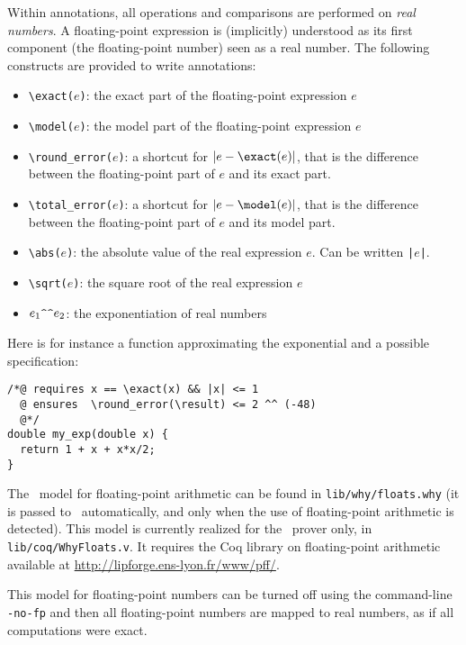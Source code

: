 \documentclass[12pt,a4paper,twoside,openright]{report}
\def\result{\char'134 result}
\begin{document}
Within annotations, all operations and comparisons are performed on
\emph{real numbers}. A floating-point expression is (implicitly)
understood as its first component (the floating-point number) seen as
a real number. The following constructs are provided to write
annotations: 

\begin{itemize}
\item \verb!\exact(!$e$\verb!)!: the exact part of the floating-point
  expression $e$
\item \verb!\model(!$e$\verb!)!: the model part of the floating-point
  expression $e$
\item \verb!\round_error(!$e$\verb!)!: a shortcut for $|e -
  \verb!\exact!(e)|$, that is the difference between the
  floating-point part of $e$ and its exact part.
\item \verb!\total_error(!$e$\verb!)!: a shortcut for $|e -
  \verb!\model!(e)|$, that is the difference between the
  floating-point part of $e$ and its model part.
\item \verb!\abs(!$e$\verb!)!: the absolute value of the real
  expression $e$. Can be written \texttt{|$e$|}.
\item \verb!\sqrt(!$e$\verb!)!: the square root of the real
  expression $e$
\item $e_1\verb!^^!e_2$: the exponentiation of real numbers
\end{itemize}

Here is for instance a function approximating the exponential and a
possible specification:
\begin{verbatim}
/*@ requires x == \exact(x) && |x| <= 1
  @ ensures  \round_error(\result) <= 2 ^^ (-48)
  @*/
double my_exp(double x) {
  return 1 + x + x*x/2;
}
\end{verbatim}

\medskip

The \why\ model for floating-point arithmetic can be found in
\texttt{lib/why/floats.why} (it is passed to \why\ automatically, and
only when the use of floating-point arithmetic is detected). This
model is currently realized for the \coq\ prover only, in
\texttt{lib/coq/WhyFloats.v}. It requires the Coq library on
floating-point arithmetic available at
\url{http://lipforge.ens-lyon.fr/www/pff/}.

This model for floating-point numbers can be turned off using the
command-line \texttt{-no-fp} and then all floating-point numbers are
mapped to real numbers, as if all computations were exact.
\end{document}
